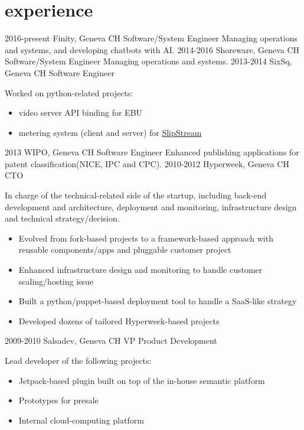 \documentclass[]{friggeri}
\begin{document}
\section{experience}

\begin{entrylist}
  \entry
    {2016-present}
    {Finity, Geneva CH}
    {Software/System Engineer}
    {Managing operations and systems, and developing chatbots with AI.}
  \entry
    {2014-2016}
    {Shoreware, Geneva CH}
    {Software/System Engineer}
    {Managing operations and systems.}
  \entry
    {2013-2014}
    {SixSq, Geneva CH}
    {Software Engineer}
    {Worked on python-related projects:
    \begin{itemize}
    \item video server API binding for \ac{EBU}
    \item metering system (client and server) for
    \href{http://sixsq.com/products/slipstream.html}{SlipStream{\texttrademark}}
    \end{itemize}}
  \entry
    {2013}
    {\ac{WIPO}, Geneva CH}
    {Software Engineer}
    {Enhanced publishing applications for patent classification(NICE, IPC
    and CPC).}
  \entry
    {2010-2012}
    {Hyperweek, Geneva CH}
    {CTO}
    {In charge of the technical-related side of the startup, including
    back-end development and architecture, deployment and monitoring,
    infrastructure design and technical strategy/decision.
    \begin{itemize}
    \item Evolved from fork-based projects to a framework-based approach with
    reusable components/apps and pluggable customer project
    \item Enhanced infrastructure design and monitoring to handle customer
    scaling/hosting issue
    \item Built a python/puppet-based deployment tool to handle a SaaS-like
    strategy
    \item Developed dozens of tailored Hyperweek-based projects
    \end{itemize}}
  \entry
    {2009-2010}
    {Salsadev, Geneva CH}
    {VP Product Development}
    {Lead developer of the following projects:
    \begin{itemize}
    \item Jetpack-based plugin built on top of the in-house semantic platform
    \item Prototypes for presale
    \item Internal cloud-computing platform

\end{itemize}}
\end{entrylist}
\end{document}
